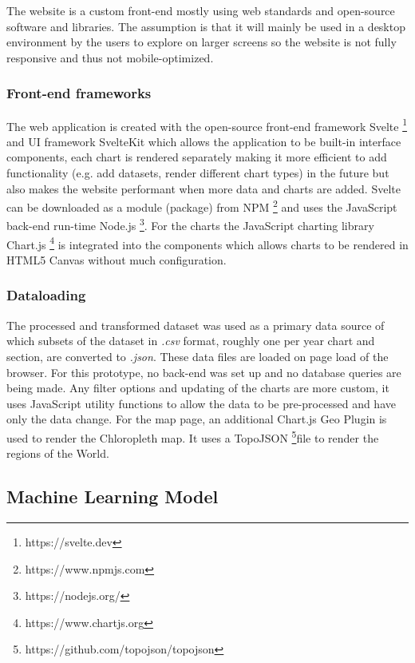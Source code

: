 The website is a custom front-end mostly using web standards and open-source software and libraries. The assumption is that it will mainly be used in a desktop environment by the users to explore on larger screens so the website is not fully responsive and thus not mobile-optimized. 

\subsubsection{Front-end frameworks}
The web application is created with the open-source front-end framework Svelte \footnote{https://svelte.dev} and UI framework SvelteKit which allows the application to be built-in interface components, each chart is rendered separately making it more efficient to add functionality (e.g. add datasets, render different chart types) in the future but also makes the website performant when more data and charts are added. Svelte can be downloaded as a module (package) from NPM \footnote{https://www.npmjs.com} and uses the JavaScript back-end run-time Node.js \footnote{https://nodejs.org/}. For the charts the JavaScript charting library Chart.js \footnote{https://www.chartjs.org} is integrated into the components which allows charts to be rendered in HTML5 Canvas without much configuration. 

\subsubsection{Dataloading}
The processed and transformed dataset was used as a primary data source of which subsets of the dataset in \textit{.csv} format, roughly one per year chart and section, are converted to \textit{.json}. These data files are loaded on page load of the browser. For this prototype, no back-end was set up and no database queries are being made. Any filter options and updating of the charts are more custom, it uses JavaScript utility functions to allow the data to be pre-processed and have only the data change. For the map page, an additional Chart.js Geo Plugin is used to render the Chloropleth map. It uses a TopoJSON \footnote{https://github.com/topojson/topojson}file to render the regions of the World.

\subsection{Machine Learning Model}
